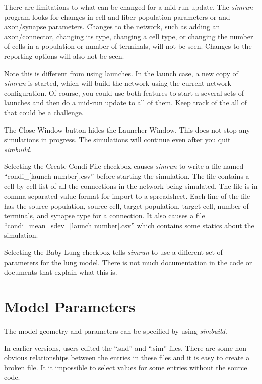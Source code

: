 \documentclass[12pt,openany,oneside]{book}
\newcommand{\prog}[1]{\textit{{#1}}}
\newcommand{\ext}[1]{{{``.#1''}}}
\newcommand{\inquotes}[1]{{{``#1''}}}
\begin{document}
There are limitations to what can be
changed for a mid-run update. The \prog{simrun} program looks for changes
in cell and fiber population parameters or and axon/synapse parameters.
Changes to the network, such as adding an axon/connector, changing its
type, changing a cell type, or changing the number of cells in a
population or number of terminals, will not be seen. Changes to the
reporting options will also not be seen.

Note this is different from using launches. In the launch case, a new copy
of \prog{simrun} is started, which will build the network using the
current network configuration. Of course, you could use both features to
start a several sets of launches and then do a mid-run update to all of
them. Keep track of the all of that could be a challenge.

The Close Window button hides the Launcher Window.  This does not stop any
simulations in progress. The simulations will continue even after
you quit \prog{simbuild}.

Selecting the Create Condi File checkbox causes \prog{simrun} to write a
file named \inquotes{condi\_[launch number].csv} before starting the
simulation. The file contains a cell-by-cell list of all the connections
in the network being simulated. The file is in comma-separated-value
format for import to a spreadsheet. Each line of the file has the source
population, source cell, target population, target cell, number of
terminals, and synapse type for a connection.  It also causes a file
\inquotes{condi\_mean\_sdev\_[launch number].csv} which contains some
statics about the simulation.

Selecting the Baby Lung checkbox tells \prog{simrun} to use a different
set of parameters for the lung model. There is not much documentation in
the code or documents that explain what this is.

\clearpage
\section{Model Parameters}
\label{Parameters}
The model geometry and parameters can be specified by using 
\prog{simbuild}. 

In earlier versions, users edited the \ext{snd} and \ext{sim} files. There
are some non-obvious relationships between the entries in these files and
it is easy to create a broken file. It it impossible to select values
for some entries without the source code.
\end{document}
